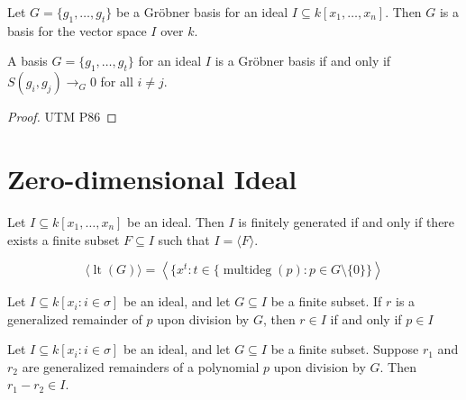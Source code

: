 \begin{lemma}\label{groebner_basis_is_basis}
  Let \( G = \{g_1, \ldots, g_t\} \) be a Gröbner basis for an ideal \( I \subseteq k[x_1, \ldots, x_n] \). Then \( G \) is a basis for the vector space \( I \) over \( k \).
\end{lemma}

\begin{lemma}\label{Buchberger Criteria}
A basis \( G = \{ g_1, \ldots, g_t \} \) for an ideal \( I \) is a Gröbner basis if and only if \( S(g_i, g_j) \to_G 0 \) for all \( i \neq j \).
\end{lemma}
\begin{proof}
 UTM P86
\end{proof}

\section{Zero-dimensional Ideal}
\begin{lemma}\label{fg_span_iff_fg_span_finset_subset}
  Let \( I \subseteq k[x_1, \ldots, x_n] \) be an ideal. Then \( I \) is finitely generated if and only if there exists a finite subset \( F \subseteq I \) such that \( I = \langle F \rangle \).
\end{lemma}

\begin{lemma}\label{leadingTerm_ideal_span_monomial}
  \leanok
  \[
  \langle \operatorname{lt}(G) \rangle = \left\langle \{ x^t : t \in \{ \operatorname{multideg}(p) : p \in G \setminus \{0\} \} \right\rangle
  \]
\end{lemma}

\begin{lemma}\label{remainder_mem_ideal_iff}
  Let \( I \subseteq k[x_i : i \in \sigma] \) be an ideal, and let \( G \subseteq I \) be a finite subset.
  If \( r \) is a generalized remainder of \( p \) upon division by \( G \),
  then \( r \in I \) if and only if \( p \in I \)
\end{lemma}

\begin{lemma}\label{remainder_sub_remainder_mem_ideal}
  Let \( I \subseteq k[x_i : i \in \sigma] \) be an ideal, and let \( G \subseteq I \) be a finite subset.
  Suppose \( r_1 \) and \( r_2 \) are generalized remainders of a polynomial \( p \) upon division by \( G \).
  Then \( r_1 - r_2 \in I \).
\end{lemma}

